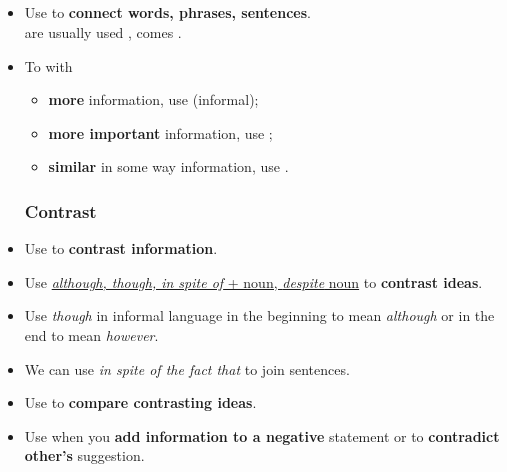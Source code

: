 \subsection{}
\begin{itemize}
    \textbf{THERE SHOULD BE SPECIFIED LINKING WORDS POSITION}\\
    \textbf{THERE SHOULD BE SPECIFIED CERTAIN DIFFERENCE IN MEANING}\\
    \subsubsection{Addition}
    \item[\doot] Use  to \textbf{connect words, phrases, sentences}.\\
     are usually used ,  comes .
    \item[\doot] To  with
    \begin{itemize}
        \item[\daash] \textbf{more} information,
        use  (informal);
        \item[\daash] \textbf{more important} information, use ;
        \item[\daash] \textbf{similar} in some way information, use .
    \end{itemize}
    \subsubsection{Contrast}
    \item[\doot] Use  to \textbf{contrast information}.
    \item[\doot] Use \underline{\textit{although, though, in spite of} + noun, \textit{despite} noun}
    to \textbf{contrast ideas}.
    \item[\aast] Use \textit{though} in informal language in the beginning
    to mean \textit{although} or in the end to mean \textit{however}.
    \item[\aast] We can use \textit{in spite of the fact that} to join sentences.
    \item[\doot] Use 
    to \textbf{compare contrasting ideas}.
    \item[\doot] Use  when you \textbf{add information to a negative} statement
    or to \textbf{contradict other's} suggestion.

\end{itemize}
